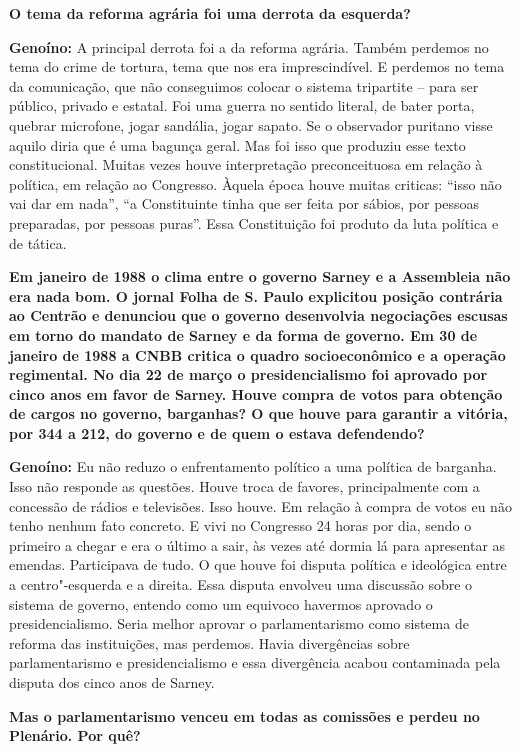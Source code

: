\textbf{O tema da reforma agrária foi uma derrota da esquerda?}

\textbf{Genoíno:} A principal derrota foi a da reforma agrária. Também
perdemos no tema do crime de tortura, tema que nos era imprescindível. E
perdemos no tema da comunicação, que não conseguimos colocar o sistema
tripartite -- para ser público, privado e estatal. Foi uma guerra no
sentido literal, de bater porta, quebrar microfone, jogar sandália,
jogar sapato. Se o observador puritano visse aquilo diria que é uma
bagunça geral. Mas foi isso que produziu esse texto constitucional.
Muitas vezes houve interpretação preconceituosa em relação à política,
em relação ao Congresso. Àquela época houve muitas criticas: ``isso não
vai dar em nada'', ``a Constituinte tinha que ser feita por sábios, por
pessoas preparadas, por pessoas puras''. Essa Constituição foi produto
da luta política e de tática.

\textbf{Em janeiro de 1988 o clima entre o governo Sarney e a Assembleia
não era nada bom. O jornal Folha de S. Paulo explicitou posição
contrária ao Centrão e denunciou que o governo desenvolvia negociações
escusas em torno do mandato de Sarney e da forma de governo. Em 30 de
janeiro de 1988 a CNBB critica o quadro socioeconômico e a operação
regimental. No dia 22 de março o presidencialismo foi aprovado por cinco
anos em favor de Sarney. Houve compra de votos para obtenção de cargos
no governo, barganhas? O que houve para garantir a vitória, por 344 a
212, do governo e de quem o estava defendendo?}

\textbf{Genoíno:} Eu não reduzo o enfrentamento político a uma política
de barganha. Isso não responde as questões. Houve troca de favores,
principalmente com a concessão de rádios e televisões. Isso houve. Em
relação à compra de votos eu não tenho nenhum fato concreto. E vivi no
Congresso 24 horas por dia, sendo o primeiro a chegar e era o último a
sair, às vezes até dormia lá para apresentar as emendas. Participava de
tudo. O que houve foi disputa política e ideológica entre a
centro"-esquerda e a direita. Essa disputa envolveu uma discussão sobre o
sistema de governo, entendo como um equivoco havermos aprovado o
presidencialismo. Seria melhor aprovar o parlamentarismo como sistema de
reforma das instituições, mas perdemos. Havia divergências sobre
parlamentarismo e presidencialismo e essa divergência acabou contaminada
pela disputa dos cinco anos de Sarney.

\textbf{Mas o parlamentarismo venceu em todas as comissões e perdeu no
Plenário. Por quê?}

